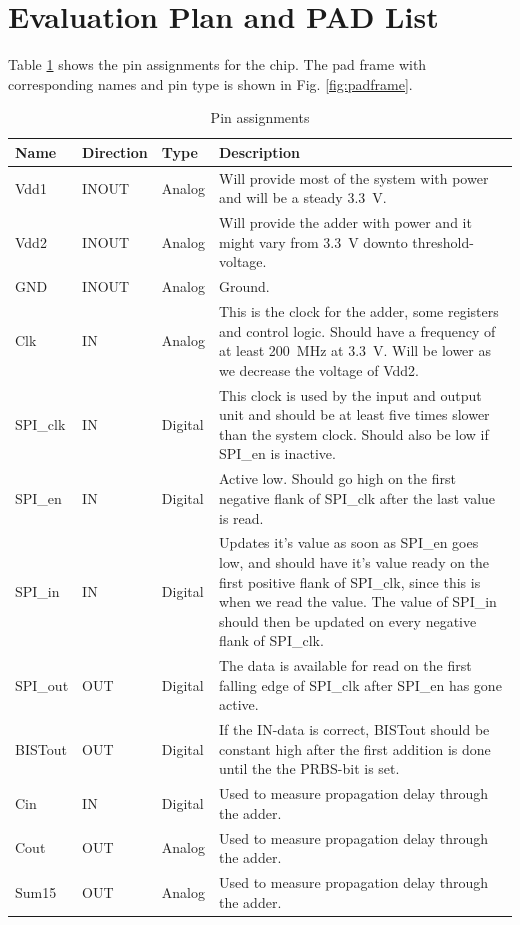 \section{Evaluation Plan and PAD List}
Table \ref{tab:pins} shows the pin assignments for the chip. The pad frame with corresponding names and pin type is shown in Fig. \ref{fig:padframe}.

\begin{table}[H]
  \caption{Pin assignments}
  \centering
  \begin{tabularx}{\linewidth}{|l|l|l|X|}
    \hline
    \textbf{Name} & \textbf{Direction} & \textbf{Type} & \textbf{Description} \\ \hline
    Vdd1 & INOUT & Analog & Will provide most of the system with power and will be a steady \SI{3.3}{\volt}. \\ \hline
    Vdd2 & INOUT & Analog & Will provide the adder with power and it might vary from \SI{3.3}{\volt} downto threshold-voltage. \\ \hline
    GND &  INOUT & Analog & Ground. \\ \hline
    Clk & IN & Analog & This is the clock for the adder, some registers and control logic. Should have a frequency of at least \SI{200}{\mega\hertz} at \SI{3.3}{\volt}. Will be lower as we decrease the voltage of Vdd2. \\ \hline
    SPI\_clk & IN & Digital & This clock is used by the input and output unit and should be at least five times slower than the system clock. Should also be low if SPI\_en is inactive. \\ \hline
    SPI\_en & IN & Digital & Active low. Should go high on the first negative flank of SPI\_clk after the last value is read. \\ \hline
    SPI\_in & IN & Digital & Updates it's value as soon as SPI\_en goes low, and should have it's value ready on the first positive flank of SPI\_clk, since this is when we read the value. The value of SPI\_in should then be updated on every negative flank of SPI\_clk. \\ \hline
    SPI\_out & OUT & Digital & The data is available for read on the first falling edge of SPI\_clk after SPI\_en has gone active. \\ \hline
    BISTout & OUT & Digital & If the IN-data is correct, BISTout should be constant high after the first addition is done until the the PRBS-bit is set.  \\ \hline
    Cin & IN & Digital & Used to measure propagation delay through the adder. \\ \hline
    Cout & OUT & Analog & Used to measure propagation delay through the adder. \\ \hline
    Sum15 & OUT & Analog & Used to measure propagation delay through the adder. \\ \hline
  \end{tabularx}
  \label{tab:pins}
\end{table}

